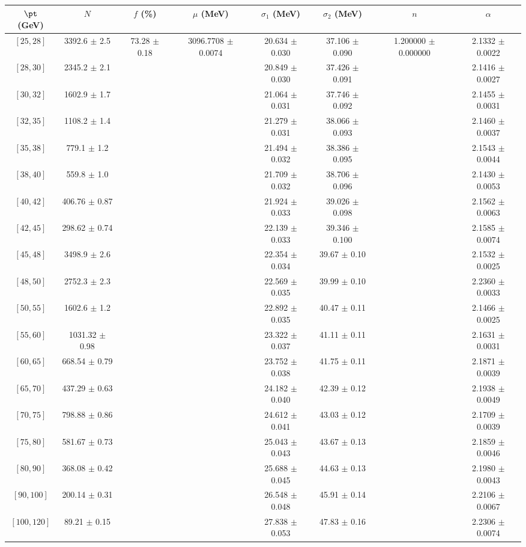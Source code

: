 \begin{tabular}{c||c|c|c|c|c|c|c}
$\pt$ (GeV) & $N$ & $f$ (\%) & $\mu$ (MeV) & $\sigma_1$ (MeV) & $\sigma_2$ (MeV) & $n$ & $\alpha$ \\
\hline
$[25, 28]$ & 3392.6 $\pm$ 2.5 & \multirow{19}{*}{73.28 $\pm$ 0.18} & \multirow{19}{*}{3096.7708 $\pm$ 0.0074} & 20.634 $\pm$ 0.030 & 37.106 $\pm$ 0.090 & \multirow{19}{*}{1.200000 $\pm$ 0.000000} & 2.1332 $\pm$ 0.0022\\
$[28, 30]$ & 2345.2 $\pm$ 2.1 &  &  & 20.849 $\pm$ 0.030 & 37.426 $\pm$ 0.091 &  & 2.1416 $\pm$ 0.0027\\
$[30, 32]$ & 1602.9 $\pm$ 1.7 &  &  & 21.064 $\pm$ 0.031 & 37.746 $\pm$ 0.092 &  & 2.1455 $\pm$ 0.0031\\
$[32, 35]$ & 1108.2 $\pm$ 1.4 &  &  & 21.279 $\pm$ 0.031 & 38.066 $\pm$ 0.093 &  & 2.1460 $\pm$ 0.0037\\
$[35, 38]$ & 779.1 $\pm$ 1.2 &  &  & 21.494 $\pm$ 0.032 & 38.386 $\pm$ 0.095 &  & 2.1543 $\pm$ 0.0044\\
$[38, 40]$ & 559.8 $\pm$ 1.0 &  &  & 21.709 $\pm$ 0.032 & 38.706 $\pm$ 0.096 &  & 2.1430 $\pm$ 0.0053\\
$[40, 42]$ & 406.76 $\pm$ 0.87 &  &  & 21.924 $\pm$ 0.033 & 39.026 $\pm$ 0.098 &  & 2.1562 $\pm$ 0.0063\\
$[42, 45]$ & 298.62 $\pm$ 0.74 &  &  & 22.139 $\pm$ 0.033 & 39.346 $\pm$ 0.100 &  & 2.1585 $\pm$ 0.0074\\
$[45, 48]$ & 3498.9 $\pm$ 2.6 &  &  & 22.354 $\pm$ 0.034 & 39.67 $\pm$ 0.10 &  & 2.1532 $\pm$ 0.0025\\
$[48, 50]$ & 2752.3 $\pm$ 2.3 &  &  & 22.569 $\pm$ 0.035 & 39.99 $\pm$ 0.10 &  & 2.2360 $\pm$ 0.0033\\
$[50, 55]$ & 1602.6 $\pm$ 1.2 &  &  & 22.892 $\pm$ 0.035 & 40.47 $\pm$ 0.11 &  & 2.1466 $\pm$ 0.0025\\
$[55, 60]$ & 1031.32 $\pm$ 0.98 &  &  & 23.322 $\pm$ 0.037 & 41.11 $\pm$ 0.11 &  & 2.1631 $\pm$ 0.0031\\
$[60, 65]$ & 668.54 $\pm$ 0.79 &  &  & 23.752 $\pm$ 0.038 & 41.75 $\pm$ 0.11 &  & 2.1871 $\pm$ 0.0039\\
$[65, 70]$ & 437.29 $\pm$ 0.63 &  &  & 24.182 $\pm$ 0.040 & 42.39 $\pm$ 0.12 &  & 2.1938 $\pm$ 0.0049\\
$[70, 75]$ & 798.88 $\pm$ 0.86 &  &  & 24.612 $\pm$ 0.041 & 43.03 $\pm$ 0.12 &  & 2.1709 $\pm$ 0.0039\\
$[75, 80]$ & 581.67 $\pm$ 0.73 &  &  & 25.043 $\pm$ 0.043 & 43.67 $\pm$ 0.13 &  & 2.1859 $\pm$ 0.0046\\
$[80, 90]$ & 368.08 $\pm$ 0.42 &  &  & 25.688 $\pm$ 0.045 & 44.63 $\pm$ 0.13 &  & 2.1980 $\pm$ 0.0043\\
$[90, 100]$ & 200.14 $\pm$ 0.31 &  &  & 26.548 $\pm$ 0.048 & 45.91 $\pm$ 0.14 &  & 2.2106 $\pm$ 0.0067\\
$[100, 120]$ & 89.21 $\pm$ 0.15 &  &  & 27.838 $\pm$ 0.053 & 47.83 $\pm$ 0.16 &  & 2.2306 $\pm$ 0.0074\\
\end{tabular}

